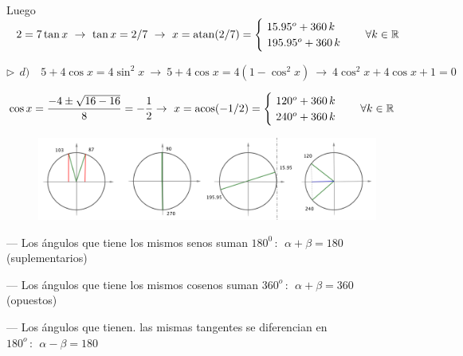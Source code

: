 \begin{miejercicio}
\vspace{2mm} Luego $\ \ 2=7\tan x \ \to \ \tan x=2/7 \ \to \ x=\atan (2/7)=\begin{cases}
\ 15.95^o+360\, k \\ \ 195.95^o+360\, k	
\end{cases} \quad \forall k \in \mathbb R $


\vspace{2mm}

\vspace{4mm} $\triangleright \ \ d)\quad 5+4\cos x=4\sin^2 x \ \to \ 5+4\cos x=4(1-\cos^2 x) \ \to \ 4\cos^2 x+4\cos x+1=0$

\vspace{2mm}$\cos x=\dfrac{-4\pm \sqrt{16-16}}{8}=-\dfrac 1 2 \to  \ x=\acos (-1/2)= \begin{cases}
 	\ 120^o+360\, k \\ \ 240^o+360\, k
 \end{cases}\quad \forall k \in \mathbb R $

\begin{figure}[H]
	\centering
	\includegraphics[width=1\textwidth]{img-rt/rt30.png}
\end{figure}

\end{miejercicio}

\begin{destacado}
--- Los ángulos que tiene los mismos senos suman $180^0\, : \ \ \alpha+\beta=180 \ $ (suplementarios)

--- Los ángulos que tiene los mismos cosenos suman $360^o\, : \ \ \alpha+\beta=360\ $ (opuestos)	

--- Los ángulos que tienen. las mismas tangentes se diferencian en $180^o\, : \ \ \alpha-\beta=180\ $
\end{destacado}


